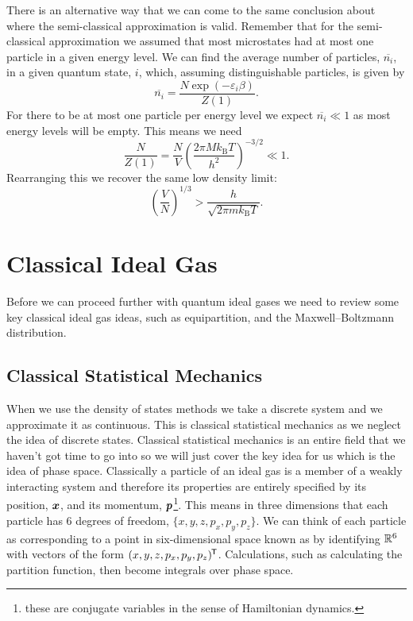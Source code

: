 \documentclass[a4paper]{article}
\newcommand{\boltzmann}{k_\mathrm{B}}
\newcommand{\mean}[1]{\overline{#1}}
\begin{document}
    There is an alternative way that we can come to the same conclusion about where the semi-classical approximation is valid.
    Remember that for the semi-classical approximation we assumed that most microstates had at most one particle in a given energy level.
    We can find the average number of particles, \(\mean{n_i}\), in a given quantum state, \(i\), which, assuming distinguishable particles, is given by
    \[\mean{n_i} = \frac{N\exp(-\varepsilon_i\beta)}{Z(1)}.\]
    For there to be at most one particle per energy level we expect \(\mean{n_i}\ll 1\) as most energy levels will be empty.
    This means we need
    \begin{equation}\label{eqn:low desnity limit}
        \frac{N}{Z(1)} = \frac{N}{V} \left( \frac{2\pi  M\boltzmann T}{h^2} \right)^{-3/2} \ll 1.
    \end{equation}
    Rearranging this we recover the same low density limit:
    \[\left( \frac{V}{N} \right)^{1/3} > \frac{h}{\sqrt{2\pi m\boltzmann T}}.\]
    
    \section{Classical Ideal Gas}
    Before we can proceed further with quantum ideal gases we need to review some key classical ideal gas ideas, such as equipartition, and the Maxwell--Boltzmann distribution.
    
    \subsection{Classical Statistical Mechanics}
    When we use the density of states methods we take a discrete system and we approximate it as continuous.
    This is classical statistical mechanics as we neglect the idea of discrete states.
    Classical statistical mechanics is an entire field that we haven't got time to go into so we will just cover the key idea for us which is the idea of phase space.
    Classically a particle of an ideal gas is a member of a weakly interacting system and therefore its properties are entirely specified by its position, \(\bm{x}\), and its momentum, \(\bm{p}\)\footnote{these are conjugate variables in the sense of Hamiltonian dynamics.}.
    This means in three dimensions that each particle has 6 degrees of freedom, \(\{x, y, z, p_x, p_y, p_z\}\).
    We can think of each particle as corresponding to a point in six-dimensional space known as  by identifying \(\mathbb{R}^6\) with vectors of the form \((x, y, z, p_x, p_y, p_z)^{\mkern-1.5mu\mathsf{T}}\).
    Calculations, such as calculating the partition function, then become integrals over phase space.
    
\end{document}
